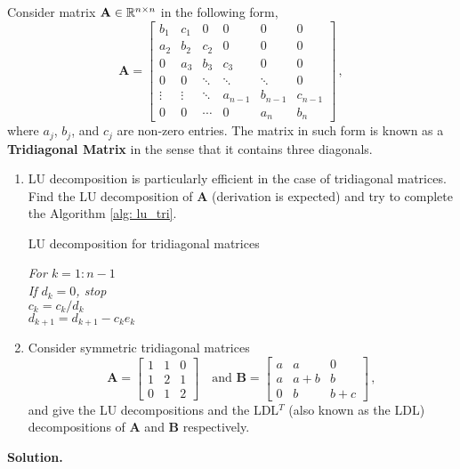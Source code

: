 \documentclass[english,onecolumn]{IEEEtran}
\begin{document}
\noindent Consider matrix ${\bf A} \in \mathbb{R}^{n\times n}$ in the following form,
\[
\mathbf{A} = 
\begin{bmatrix}
	b_1 & c_1 &  0  &  0 & 0  & 0 \\
	a_2 & b_2 & c_2 &  0 & 0  & 0 \\
	0   & a_3 & b_3 & c_3 & 0 & 0 \\
	0   & 0 & \ddots & \ddots& \ddots&0\\
	\vdots & \vdots & \ddots& a_{n-1}& b_{n-1}& c_{n-1}\\
	0 & 0 & \cdots & 0 & a_{n} & b_n 
\end{bmatrix}\,,
\]
where $a_j$, $b_j$, and $c_j$ are non-zero entries.
The matrix in such form is known as a \textbf{Tridiagonal Matrix} in the sense that it contains three diagonals.
\begin{enumerate}
	\item LU decomposition is particularly efficient in the case of tridiagonal matrices. Find the LU decomposition of $\mathbf{A}$ (derivation is expected) and try to complete the Algorithm \ref{alg: lu_tri}.
\begin{algorithm}[htbp]
\label{alg: lu_tri}
\caption{LU decomposition for tridiagonal matrices}
\SetAlgoLined
{}
\textit{For $k=1:n-1$}\\
\textit{If $d_{k}=0$, stop}\\
\textit{$c_{k}=c_{k}/d_{k}$}\\
\textit{$d_{k+1}=d_{k+1}-c_{k}e_{k}$}
\end{algorithm}
\item
Consider symmetric tridiagonal matrices
\[
\mathbf{A} = \begin{bmatrix}
    1 & 1 & 0\\
    1 & 2 & 1 \\
    0 & 1 & 2 
\end{bmatrix}
\quad \text{and  }
\mathbf{B}= \begin{bmatrix}
    a & a & 0 \\
    a & a+b & b \\
    0 & b & b+c
\end{bmatrix}\,,
\]
and give the LU decompositions and the LDL$^T$ (also known as the LDL) decompositions of $\mathbf{A}$ and $\mathbf{B}$ respectively.
\end{enumerate}
\noindent\textbf{Solution.}
\end{document}
